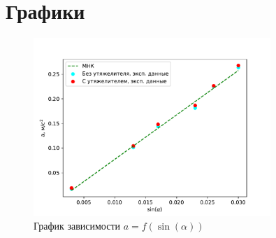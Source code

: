\section{Графики}
\begin{figure}[ht]
    \centering
    \includegraphics[width=0.8\textwidth]{./graph.pdf}
    \caption{График зависимости $a = f(\sin(\alpha))$}
    \label{fig:graph}
\end{figure}
